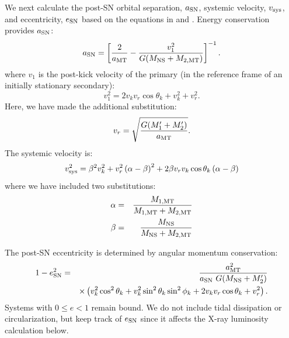 \documentclass[usenatbib]{mnras}
\begin{document}
We next calculate the post-SN orbital separation, $a_{\rm SN}$, systemic velocity, $v_{\rm sys}$, and eccentricity, $e_{\rm SN}$ based on the equations in \citet{hills83} and \citet{kalogera96}. Energy conservation provides $a_{\rm SN}$:
\begin{equation}
a_{\rm SN} = \left[ \frac{2 }{a_{\rm MT}}  - \frac{v_1^2}{G(M_{\rm NS} + M_{\rm 2, MT})} \right]^{-1}. \label{eq:SN_A} \\
\end{equation}
where $v_1$ is the post-kick velocity of the primary (in the reference frame of an initially stationary secondary):
\begin{equation}
v_1^2 = 2v_k v_r \cos \theta_k + v_k^2 + v_r^2. \label{eq:v_1}
\end{equation}
Here, we have made the additional substitution:
\begin{equation}
v_r = \sqrt{\frac{G (M_1' + M_2')}{a_{\rm MT}}}. \label{eq:v_r}
\end{equation}
The systemic velocity is:
\begin{equation}
v_{\rm sys}^2 = \beta^2 v_k^2
   + v_r^2 \left( \alpha - \beta \right)^2
   + 2 \beta v_r v_k \cos \theta_k \left( \alpha - \beta \right)
    \label{eq:SN_v_sys}
\end{equation}
where we have included two substitutions:
\begin{eqnarray}
\alpha &=& \frac{M_{\rm 1, MT}}{M_{\rm 1, MT} + M_{\rm 2, MT}} \\
\beta &=& \frac{M_{\rm NS}}{M_{\rm NS} + M_{\rm 2, MT}}
\end{eqnarray}


The post-SN eccentricity is determined by angular momentum conservation:
\begin{eqnarray}
1-e_{\rm SN}^2 &=& \frac{a_{\rm MT}^2}{a_{\rm SN}\ G (M_{\rm NS} + M_2')} \nonumber \\
 & & \times \left( v_k^2 \cos^2\theta_k + v_k^2 \sin^2 \theta_k \sin^2 \phi_k + 2 v_k v_r \cos \theta_k + v_r^2  \right). \label{eq:SN_e}
\end{eqnarray}
Systems with $0 \leq e < 1$ remain bound. We do not include tidal dissipation or circularization, but keep track of $e_{\rm SN}$ since it affects the X-ray luminosity calculation below.
\end{document}
